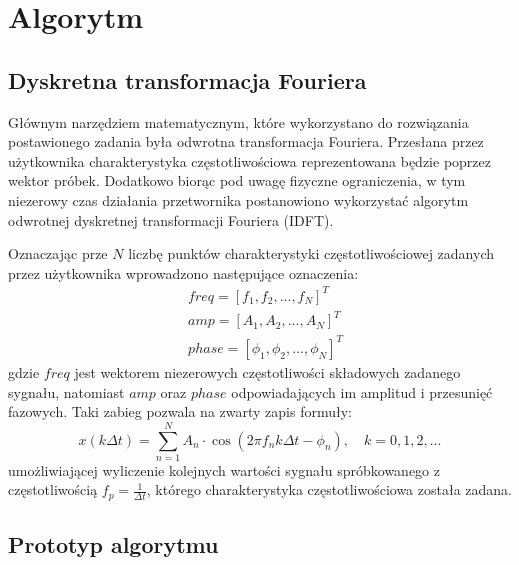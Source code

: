 \section{Algorytm}
\label{algorytm}
\subsection{Dyskretna transformacja Fouriera}
Głównym narzędziem matematycznym, które wykorzystano do rozwiązania postawionego zadania była odwrotna transformacja Fouriera. Przesłana przez użytkownika charakterystyka częstotliwościowa reprezentowana będzie poprzez wektor próbek. Dodatkowo biorąc pod uwagę fizyczne ograniczenia, w tym niezerowy czas działania przetwornika postanowiono wykorzystać algorytm odwrotnej dyskretnej transformacji Fouriera (IDFT). 

Oznaczając prze $N$ liczbę punktów charakterystyki częstotliwościowej zadanych przez użytkownika wprowadzono następujące oznaczenia:
\begin{align*} 
&freq = [f_1, f_2, ..., f_N]^T \\ 
&amp = [A_1, A_2, ..., A_N]^T \\
&phase = [\phi_1, \phi_2, ..., \phi_N]^T
\end{align*}
gdzie $freq$ jest wektorem niezerowych częstotliwości składowych zadanego sygnału, natomiast $amp$ oraz $phase$ odpowiadających im amplitud i przesunięć fazowych. Taki zabieg pozwala na zwarty zapis formuły:
\begin{equation}
x(k\Delta t) = \sum_{n=1}^{N}A_n\cdot\cos(2 \pi f_nk \Delta t - \phi_n), \quad k=0,1,2,...
\end{equation}
umożliwiającej wyliczenie kolejnych wartości sygnału spróbkowanego z częstotliwością $f_p=\frac{1}{\Delta t}$, którego charakterystyka częstotliwościowa została zadana.

\subsection{Prototyp algorytmu}


